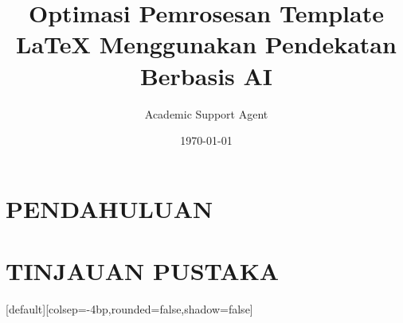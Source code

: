\documentclass{beamer}
\title{Optimasi Pemrosesan Template LaTeX Menggunakan Pendekatan Berbasis AI}
\author{Academic Support Agent}
\date{\today}
\begin{document}
\maketitle

\begin{abstract}

\end{abstract}

\chapter{PENDAHULUAN}


\chapter{TINJAUAN PUSTAKA}




\usepackage[T1]{fontenc}
\usepackage[utf8]{inputenc}
\usepackage{lmodern}
\usepackage[backend=biber,citestyle=authoryear,bibstyle=authoryear]{biblatex}

\usepackage{mathtools}
\usepackage{xfrac}
\usepackage[finnish, british]{babel}
\usepackage{cleveref}						%
\renewcommand*\familydefault{\ttdefault} %
\usepackage{courier}


%
%

\DeclareMathOperator*{\E}{\mathbb{E}}				%



\graphicspath{{./plotit/}}


\beamertemplatenavigationsymbolsempty	%
[default][colsep=-4bp,rounded=false,shadow=false] %
\end{document}
